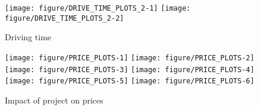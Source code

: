 \documentclass{article}\usepackage[]{graphicx}\usepackage[]{color}
\newenvironment{knitrout}{}{} %
\begin{document}
\begin{knitrout}\scriptsize
{}\color{fgcolor}\begin{figure}
\texttt{[image: figure/DRIVE\_TIME\_PLOTS\_2-1]} 
\texttt{[image: figure/DRIVE\_TIME\_PLOTS\_2-2]} \caption[Driving time]{Driving time}\label{fig:DRIVE_TIME_PLOTS_2}
\end{figure}


\end{knitrout}


\begin{knitrout}\scriptsize
{}\color{fgcolor}\begin{figure}
\texttt{[image: figure/PRICE\_PLOTS-1]} 
\texttt{[image: figure/PRICE\_PLOTS-2]} 
\texttt{[image: figure/PRICE\_PLOTS-3]} 
\texttt{[image: figure/PRICE\_PLOTS-4]} 
\texttt{[image: figure/PRICE\_PLOTS-5]} 
\texttt{[image: figure/PRICE\_PLOTS-6]} \caption[Impact of project on prices]{Impact of project on prices}\label{fig:PRICE_PLOTS}
\end{figure}


\end{knitrout}
\end{document}
